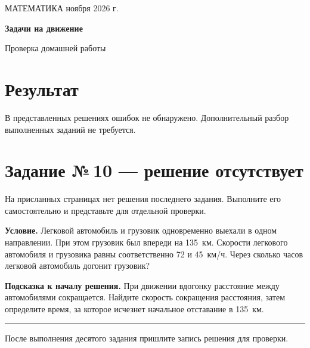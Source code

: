 \documentclass[a4paper,12pt]{article}
\begin{document}
\vspace*{11mm}
{\large\color{muted}МАТЕМАТИКА \quad\textbullet{} ноября 2026 г.}\par
\vspace{8mm}
{\LARGE\bfseries\color{accent}Задачи на движение}\par
{\large\color{muted}Проверка домашней работы}\par
\vspace{10mm}
\section*{\color{accent}Результат}
В представленных решениях ошибок не обнаружено. Дополнительный разбор выполненных заданий не требуется.
\vspace{8mm}
\section*{\color{accent}Задание №\,10 --- решение отсутствует}
На присланных страницах нет решения последнего задания. Выполните его самостоятельно и представьте для отдельной проверки.

\textbf{Условие.} Легковой автомобиль и грузовик одновременно выехали в одном направлении. При этом грузовик был впереди на 135~км. Скорости легкового автомобиля и грузовика равны соответственно 72 и 45~км/ч. Через сколько часов легковой автомобиль догонит грузовик?

\textbf{Подсказка к началу решения.} При движении вдогонку расстояние между автомобилями сокращается. Найдите скорость сокращения расстояния, затем определите время, за которое исчезнет начальное отставание в 135~км.
\vfill
{\color{rulecolor}\rule{\linewidth}{0.6pt}}
{\small\color{muted}После выполнения десятого задания пришлите запись решения для проверки.}
\end{document}
